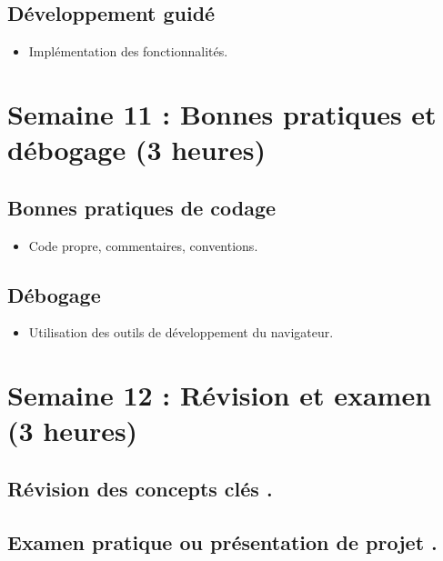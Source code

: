 \documentclass[12pt]{article}
\begin{document}
\subsection*{Développement guidé }
\begin{itemize}
    \item Implémentation des fonctionnalités.
\end{itemize}

\section*{Semaine 11 : Bonnes pratiques et débogage (3 heures)}
\subsection*{Bonnes pratiques de codage }
\begin{itemize}
    \item Code propre, commentaires, conventions.
\end{itemize}

\subsection*{Débogage }
\begin{itemize}
    \item Utilisation des outils de développement du navigateur.
\end{itemize}

\section*{Semaine 12 : Révision et examen (3 heures)}
\subsection*{Révision des concepts clés .}
\subsection*{Examen pratique ou présentation de projet .}


\renewcommand{\footrulewidth}{0.4pt} %
\end{document}
